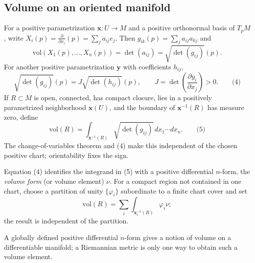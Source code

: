 \subsection{Volume on an oriented manifold}

For a positive parametrization $\mathbf{x}:U\to M$ and a positive orthonormal
basis of $T_pM$, write
$X_i(p)=\frac{\partial}{\partial x_i}(p)=\sum_j a_{ij}e_j$. Then
$g_{ik}(p)=\sum_j a_{ij}a_{kj}$ and
$$
\mathrm{vol}(X_1(p),\ldots,X_n(p))=\det(a_{ij})=\sqrt{\det(g_{ij})}(p).
$$
For another positive parametrization $\mathbf{y}$ with coefficients $h_{ij}$,
$$
\sqrt{\det(g_{ij})}(p)=J\sqrt{\det(h_{ij})}(p),\qquad
J=\det\left(\frac{\partial y_i}{\partial x_j}\right)>0.\qquad\text{(4)}
$$
If $R\subset M$ is open, connected, has compact closure, lies in a positively
parametrized neighborhood $\mathbf{x}(U)$, and the boundary of
$\mathbf{x}^{-1}(R)$ has measure zero, define
$$
\mathrm{vol}(R)=\int_{\mathbf{x}^{-1}(R)}\sqrt{\det(g_{ij})}\,dx_1\cdots dx_n.\qquad\text{(5)}
$$
The change-of-variables theorem and (4) make this independent of the chosen
positive chart; orientability fixes the sign.

\begin{remark}
  \label{rem:dc-ch1-2-11}
  Equation (4) identifies the integrand in (5) with a positive differential
  $n$-form, the \emph{volume form} (or volume element) $\nu$. For a compact region
  not contained in one chart, choose a partition of unity $\{\varphi_i\}$ subordinate
  to a finite chart cover and set
  $$
  \mathrm{vol}(R)=\sum_i\int_{\mathbf{x}_i^{-1}(R)}\varphi_i\nu;
  $$
  the result is independent of the partition.
\end{remark}

\begin{remark}
  \label{rem:dc-ch1-2-12}
  A globally defined positive differential $n$-form gives a notion of volume on a
  differentiable manifold; a Riemannian metric is only one way to obtain such a
  volume element.
\end{remark}
